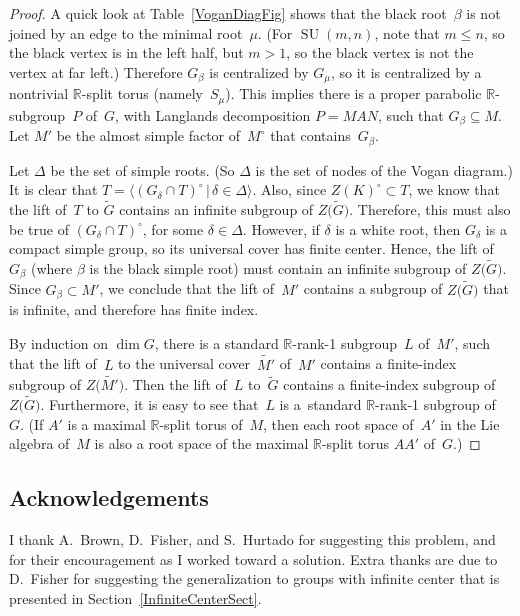 \documentclass[pdftex]{sigma}
\newcommand{\RR}{\mathbb{R}}
\DeclareMathOperator{\SU}{SU}
\newcommand{\cover}{\widetilde}
\numberwithin{equation}{section}
\theoremstyle{definition}
\begin{document}
\begin{proof}
A quick look at Table~\ref{VoganDiagFig} shows that the black root~$\beta$ is not joined by an edge to the minimal root~$\mu$. (For $\SU(m,n)$, note that $m \le n$, so the black vertex is in the left half, but $m > 1$, so the black vertex is not the vertex at far left.) Therefore $G_\beta$ is centralized by $G_\mu$, so it is centralized by a nontrivial $\RR$-split torus (namely~$S_\mu$). This implies there is a proper parabolic $\RR$-subgroup~$P$ of~$G$, with Langlands decomposition $P = MAN$, such that $G_\beta \subseteq M$. Let $M'$ be the almost simple factor of~$M^\circ$ that contains~$G_\beta$.

Let $\Delta$ be the set of simple roots. (So $\Delta$ is the set of nodes of the Vogan diagram.) It is clear that $T = \langle (G_\delta \cap T)^\circ \,|\, \delta \in \Delta \rangle$.
Also, since $Z(K)^\circ \subset T$, we know that the lift of~$T$ to $\cover G$ contains an infinite subgroup of $Z\big(\cover G\big)$. Therefore, this must also be true of $(G_\delta \cap T)^\circ$, for some $\delta \in \Delta$. However, if $\delta$ is a white root, then $G_\delta$ is a compact simple group, so its universal cover has finite center. Hence, the lift of $G_\beta$ (where $\beta$ is the black simple root) must contain an infinite subgroup of $Z\big(\cover G\big)$. Since $G_\beta \subset M'$, we conclude that the lift of~$M'$ contains a subgroup of $Z\big(\cover G\big)$ that is infinite, and therefore has finite index.

By induction on $\dim G$, there is a standard $\RR$-rank-1 subgroup~$L$ of~$M'$, such that the lift of~$L$ to the universal cover~$\cover{M'}$ of~$M'$ contains a finite-index subgroup of $Z\big(\cover{M'}\big)$. Then the lift of~$L$ to~$\cover G$ contains a finite-index subgroup of $Z\big(\cover G\big)$.
Furthermore, it is easy to see that~$L$ is a~standard $\RR$-rank-1 subgroup of~$G$. (If $A'$ is a maximal $\RR$-split torus of~$M$, then each root space of~$A'$ in the Lie algebra of~$M$ is also a root space of the maximal $\RR$-split torus $A A'$ of~$G$.)
\end{proof}

\subsection*{Acknowledgements}
I thank A.~Brown, D.~Fisher, and S.~Hurtado for suggesting this problem, and for their encouragement as I worked toward a solution. Extra thanks are due to D.~Fisher for suggesting the generalization to groups with infinite center that is presented in Section~\ref{InfiniteCenterSect}.
\end{document}
